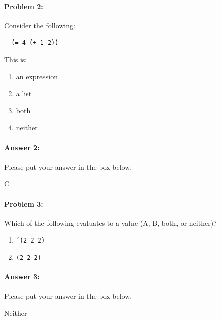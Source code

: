\documentclass[10pt]{article}
\newenvironment{AnswerBox}{\begin{mdframed}[style=simple]}{\end{mdframed}}
\begin{document}
\noindent\hrulefill%

\paragraph{Problem 2:} Consider the following:
\begin{lstlisting}
  (= 4 (+ 1 2))
\end{lstlisting}
This is:
\begin{enumerate}[nosep, label=\Alph*.]
  \item an expression
  \item a list
  \item both
  \item neither
\end{enumerate}

\paragraph{Answer 2:} Please put your answer in the box below.

\begin{AnswerBox}%

    C

\end{AnswerBox}%

\hrulefill%

\paragraph{Problem 3:} Which of the following evaluates to a value (A, B, both,
or neither)?

\begin{enumerate}[nosep, label=\Alph*.]
  \item \texttt{'(2 2 2)}
  \item \texttt{(2 2 2)}
\end{enumerate}

\paragraph{Answer 3:} Please put your answer in the box below.

\begin{AnswerBox}%

  Neither

\end{AnswerBox}%
\end{document}
